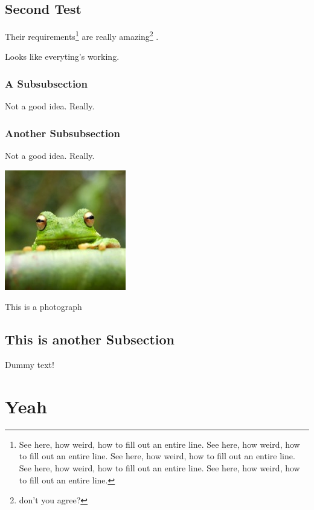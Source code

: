 \subsection{Second Test}
Their \cite{audibert:2004} requirements\footnote{See here, how weird, how to fill out an entire line. See here, how weird, how to fill out an entire line. See here, how weird, how to fill out an entire line. See here, how weird, how to fill out an entire line. See here, how weird, how to fill out an entire line. } are really amazing\footnote{don't you agree?} \cite[34]{budanitsky:hirst:2006}.

Looks like everyting's working. 

\subsubsection{A Subsubsection}

Not a good idea. Really.

\subsubsection{Another Subsubsection}

Not a good idea. Really.

\begin{photo}[hbt!]
\centering
\includegraphics[width=.5\linewidth]{frog}
\caption{This is a photograph}
\end{photo}

\subsection{This is another Subsection}

Dummy text! \lipsum[1]

\section{Yeah}

